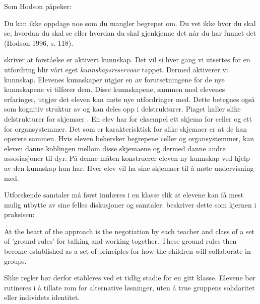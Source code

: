 \documentclass[main.tex]{subfiles}
\begin{document}
\begin{displayquote}
\guillemotleft Som Hodson påpeker:
\begin{displayquote}
Du kan ikke oppdage noe som du mangler begreper om. Du vet ikke hvor du skal se, hvordan du skal se 
eller hvordan du skal gjenkjenne det når du har funnet det (Hodson 1996, s. 118). \guillemotright
\end{displayquote}
\end{displayquote}
 skriver at forståelse er aktivert kunnskap. Det vil si hver gang vi utsettes 
for en utfordring blir vårt eget \emph{kunnskapsreservoar} tappet. Dermed aktiverer vi kunnskap. 
Elevenes kunnskaper utgjør en av forutsetningene for de nye kunnskapene vi tilfører dem. Disse 
kunnskapene, sammen med elevenes erfaringer, utgjør det eleven kan møte nye utfordringer med. Dette 
betegnes også som kognitiv struktur av \citeauthor{solv92} og kan deles opp i delstrukturer. Piaget 
kaller slike delstrukturer for skjemaer . En elev har for eksempel ett skjema 
for celler og ett for organsystemmer. Det som er karakterisktisk for slike skjemaer er at de kan 
operere sammen. Hvis eleven behersker begrepene celler og organsystemmer, kan eleven danne koblingen
mellom disse skjemaene og dermed danne andre assosiasjoner til dyr. På denne måten konstruerer 
eleven ny kunnskap ved hjelp av den kunnskap hun har. Hver elev vil ha sine skjemaer til å møte 
undervisning med.

Utforskende samtaler må først innlæres i en klasse slik at elevene kan få mest mulig
utbytte av sine felles diskusjoner og samtaler.  beskriver dette som kjernen i 
praksisen:
\begin{displayquote}
\guillemotleft
At the heart of the approach is the negotiation by each teacher and class of a set of 'ground
rules' for talking and working together. These ground rules then become established as a set of 
principles for how the children will collaborate in groups.
\guillemotright
\end{displayquote}
Slike regler bør derfor etableres ved et tidlig stadie for en gitt klasse. Elevene bør rutineres
i å tillate rom for alternative løsninger, uten å true gruppens solidaritet eller individets 
identitet. 
\end{document}
